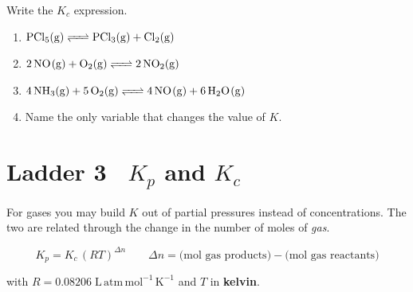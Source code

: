 \documentclass{apchem-worksheet}
\begin{document}
\begin{yourturn}
Write the $K_{c}$ expression.
\begin{enumerate}[leftmargin=*,itemsep=0.5em]
  \item $\ce{PCl5(g) <=> PCl3(g) + Cl2(g)}$ \workspace[1.6cm]
  \item $\ce{2NO(g) + O2(g) <=> 2NO2(g)}$ \workspace[1.6cm]
  \item $\ce{4NH3(g) + 5O2(g) <=> 4NO(g) + 6H2O(g)}$
        \workspace[1.8cm]
  \item Name the only variable that changes the value of $K$.
        \workspace[1.4cm]
\end{enumerate}
\end{yourturn}

\section*{\sffamily Ladder 3 \textbullet\ $K_{p}$ and $K_{c}$}

For gases you may build $K$ out of partial pressures instead of
concentrations. The two are related through the change in the number of
moles of \emph{gas}.

\[ K_{p} = K_{c}\,(RT)^{\Delta n}
   \qquad
   \Delta n = \big(\text{mol gas products}\big)
            - \big(\text{mol gas reactants}\big) \]

with $R = 0.08206\;\mathrm{L\,atm\,mol^{-1}\,K^{-1}}$ and $T$ in
\textbf{kelvin}.
\end{document}
